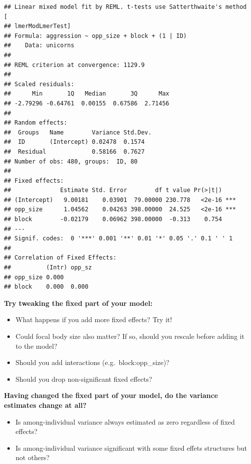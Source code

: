 \documentclass[
  12pt,
]{book}
\makeatletter
\providecommand{\tightlist}{%
  \setlength{\itemsep}{0pt}\setlength{\parskip}{0pt}}
\newenvironment{kframe}{%
\medskip{}
\setlength{\fboxsep}{.8em}
\def\at@end@of@kframe{}%
\ifinner\ifhmode%
 \def\at@end@of@kframe{\end{minipage}}%
 \begin{minipage}{\columnwidth}%
\fi\fi%
\def\FrameCommand##1{\hskip\@totalleftmargin \hskip-\fboxsep
\colorbox{incolor}{##1}\hskip-\fboxsep
    \hskip-\linewidth \hskip-\@totalleftmargin \hskip\columnwidth}%
\MakeFramed {\advance\hsize-\width
  \@totalleftmargin\z@ \linewidth\hsize
  \@setminipage}}%
{\par\unskip\endMakeFramed%
\at@end@of@kframe}
\newenvironment{rmdblock}[1]
 {
 \begin{itemize}
 \renewcommand{\labelitemi}{
   \raisebox{-.7\height}[0pt][0pt]{
     {\setkeys{Gin}{width=3em,keepaspectratio}\texttt{[image: images/icons/\#1]}}
   }
 }
 \begin{kframe}
 \setlength{\fboxsep}{1em}
 \item
 }
 {
 \end{kframe}
 \end{itemize}
 }
\newenvironment{rmdcode}
  {\begin{rmdblock}{code}}
  {\end{rmdblock}}
\makeatother
\begin{document}
\begin{verbatim}
## Linear mixed model fit by REML. t-tests use Satterthwaite's method [
## lmerModLmerTest]
## Formula: aggression ~ opp_size + block + (1 | ID)
##    Data: unicorns
## 
## REML criterion at convergence: 1129.9
## 
## Scaled residuals: 
##      Min       1Q   Median       3Q      Max 
## -2.79296 -0.64761  0.00155  0.67586  2.71456 
## 
## Random effects:
##  Groups   Name        Variance Std.Dev.
##  ID       (Intercept) 0.02478  0.1574  
##  Residual             0.58166  0.7627  
## Number of obs: 480, groups:  ID, 80
## 
## Fixed effects:
##              Estimate Std. Error        df t value Pr(>|t|)    
## (Intercept)   9.00181    0.03901  79.00000 230.778   <2e-16 ***
## opp_size      1.04562    0.04263 398.00000  24.525   <2e-16 ***
## block        -0.02179    0.06962 398.00000  -0.313    0.754    
## ---
## Signif. codes:  0 '***' 0.001 '**' 0.01 '*' 0.05 '.' 0.1 ' ' 1
## 
## Correlation of Fixed Effects:
##          (Intr) opp_sz
## opp_size 0.000        
## block    0.000  0.000
\end{verbatim}

\begin{rmdcode}
\textbf{Try tweaking the fixed part of your model:}

\begin{itemize}
\tightlist
\item
  What happens if you add more fixed effects? Try it!
\item
  Could focal body size also matter? If so, should you rescale before adding it to the model?
\item
  Should you add interactions (e.g.~block:opp\_size)?
\item
  Should you drop non-significant fixed effects?
\end{itemize}
\end{rmdcode}

\begin{rmdcode}
\textbf{Having changed the fixed part of your model, do the variance estimates change at all?}

\begin{itemize}
\tightlist
\item
  Is among-individual variance always estimated as zero regardless of fixed effects?
\item
  Is among-individual variance significant with some fixed effets structures but not others?
\end{itemize}
\end{rmdcode}
\end{document}
